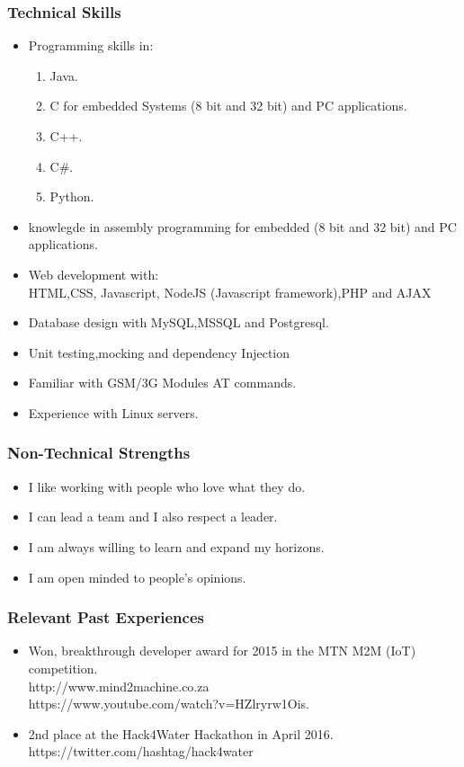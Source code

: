 \documentclass{scrartcl}
\begin{document}
\subsubsection{Technical Skills}
\begin{itemize}
\item Programming skills in:
\begin{enumerate}
\item Java.
\item C for embedded Systems (8 bit and 32 bit) and PC applications.
\item C++.
\item C\#.
\item Python.
\end{enumerate}
\item knowlegde in assembly programming for embedded (8 bit and 32 bit) and PC applications.
\item Web development with:\\
HTML,CSS, Javascript, NodeJS (Javascript framework),PHP and AJAX
\item Database design with MySQL,MSSQL and Postgresql.
\item Unit testing,mocking and dependency Injection
\item Familiar with GSM/3G Modules AT commands.
\item Experience with Linux servers.
\end{itemize}
\subsubsection{Non-Technical Strengths}
\begin{itemize}
\item I like working with people who love what they do.
\item I can lead a team and I also respect a leader.
\item I am always willing to learn and expand my horizons.
\item I am open minded to people's opinions.
\end{itemize}
\subsubsection{Relevant Past Experiences}
\begin{itemize}
\item Won, breakthrough developer award for 2015 in the MTN M2M (IoT) competition.\\
http://www.mind2machine.co.za \\
https://www.youtube.com/watch?v=HZlryrw1Ois.
\item 2nd place at the Hack4Water Hackathon in April 2016.\\
https://twitter.com/hashtag/hack4water
\end{itemize}
\end{document}
